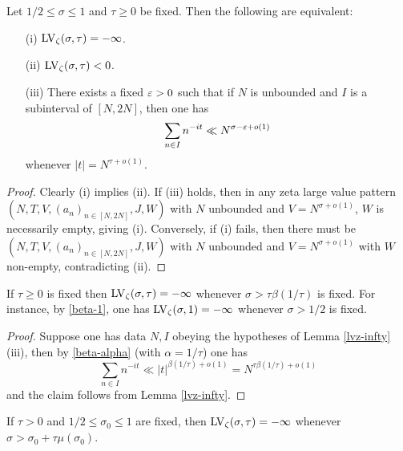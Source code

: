 \begin{lemma}\label{lvz-infty}  Let $1/2 \leq \sigma \leq 1$ and $\tau \geq 0$ be fixed. Then the following are equivalent:
    \begin{itemize}
        \item[(i)] $\mathrm{LV}_\zeta(\sigma,\tau)=-\infty$.
        \item[(ii)] $\mathrm{LV}_\zeta(\sigma,\tau) < 0$.
        \item[(iii)] There exists a fixed $\varepsilon>0$ such that if $N$ is unbounded and $I$ is a subinterval of $[N, 2N]$, then one has
              $$ \sum_{n \in I} n^{-it} \ll N^{\sigma-\varepsilon+o(1)}$$
              whenever $|t| = N^{\tau+o(1)}$.
    \end{itemize}
\end{lemma}

\begin{proof} Clearly (i) implies (ii).
    If (iii) holds, then in any zeta large value pattern
    $(N,T,V,(a_n)_{n \in [N,2N]},J,W)$ with $N$ unbounded and $V = N^{\sigma+o(1)}$, $W$ is necessarily empty, giving (i). Conversely, if (i) fails, then there must be $(N,T,V,(a_n)_{n \in [N,2N]},J,W)$ with $N$ unbounded and $V = N^{\sigma+o(1)}$ with $W$ non-empty, contradicting (ii).
\end{proof}

\begin{corollary}\label{beta-zeta-vanish}  If $\tau \geq 0$ is fixed then $\mathrm{LV}_\zeta(\sigma,\tau) = -\infty$ whenever $\sigma > \tau \beta(1/\tau)$ is fixed. For instance, by \eqref{beta-1}, one has $\mathrm{LV}_\zeta(\sigma,1)=-\infty$ whenever $\sigma > 1/2$ is fixed.
\end{corollary}

\begin{proof} Suppose one has data $N, I$  obeying the hypotheses of Lemma \ref{lvz-infty}(iii), then by \eqref{beta-alpha} (with $\alpha = 1/\tau$) one has
    $$ \sum_{n \in I} n^{-it} \ll |t|^{\beta(1/\tau)+o(1)} = N^{\tau \beta(1/\tau)+o(1)}$$
    and the claim follows from Lemma \ref{lvz-infty}.
\end{proof}

\begin{corollary}\label{lvz-mu}  If $\tau > 0$ and $1/2 \leq \sigma_0 \leq 1$ are fixed, then $\mathrm{LV}_\zeta(\sigma,\tau) = -\infty$ whenever $\sigma > \sigma_0 + \tau \mu(\sigma_0)$.
\end{corollary}

